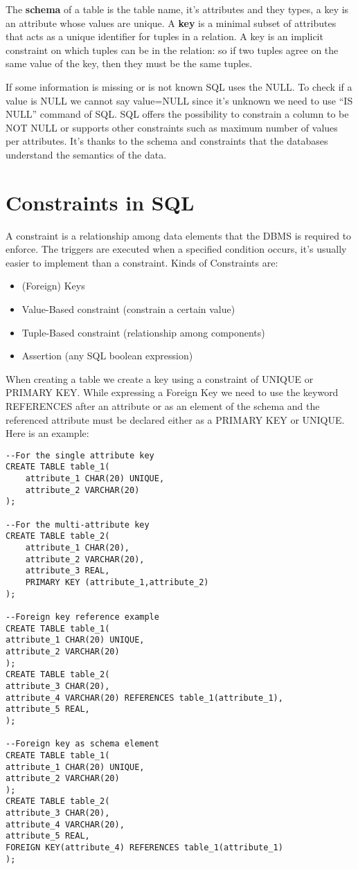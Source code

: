 \documentclass[a4page, 11pt]{article}
\begin{document}
The \textbf{schema} of a table is the table name, it's attributes and they types, a key is an attribute whose values are unique. A \textbf{key} is a minimal subset of attributes that acts as a unique identifier for tuples in a relation. A key is an implicit constraint on which tuples can be in the relation: so if two tuples agree on the same value of the key, then they must be the same tuples. 

If some information is missing or is not known SQL uses the NULL. To check if a value is NULL we cannot say value=NULL since it's unknown we need to use ``IS NULL'' command of SQL. SQL offers the possibility to constrain a column to be NOT NULL or supports other constraints such as maximum number of values per attributes.
It's thanks to the schema and constraints that the databases understand the semantics of the data.

\section{Constraints in SQL}
A constraint is a relationship among data elements that the DBMS is required to enforce. The triggers are executed when a specified condition occurs, it's usually easier to implement than a constraint. 
Kinds of Constraints are:
\begin{itemize}[noitemsep]
	\item (Foreign) Keys
	\item Value-Based constraint (constrain a certain value)
	\item Tuple-Based constraint (relationship among components)
	\item Assertion (any SQL boolean expression)
\end{itemize}

When creating a table we create a key using a constraint of UNIQUE or PRIMARY KEY. While expressing a Foreign Key we need to use the keyword REFERENCES after an attribute or as an element of the schema and the referenced attribute must be declared either as a PRIMARY KEY or UNIQUE. Here is an example:
\begin{lstlisting}
--For the single attribute key
CREATE TABLE table_1(
	attribute_1 CHAR(20) UNIQUE,
	attribute_2 VARCHAR(20)
);

--For the multi-attribute key
CREATE TABLE table_2(
	attribute_1 CHAR(20),
	attribute_2 VARCHAR(20),
	attribute_3 REAL,
	PRIMARY KEY (attribute_1,attribute_2)
);

--Foreign key reference example
CREATE TABLE table_1(
attribute_1 CHAR(20) UNIQUE,
attribute_2 VARCHAR(20)
);
CREATE TABLE table_2(
attribute_3 CHAR(20),
attribute_4 VARCHAR(20) REFERENCES table_1(attribute_1),
attribute_5 REAL,
);

--Foreign key as schema element
CREATE TABLE table_1(
attribute_1 CHAR(20) UNIQUE,
attribute_2 VARCHAR(20)
);
CREATE TABLE table_2(
attribute_3 CHAR(20),
attribute_4 VARCHAR(20),
attribute_5 REAL,
FOREIGN KEY(attribute_4) REFERENCES table_1(attribute_1)
);
\end{lstlisting}
\end{document}
